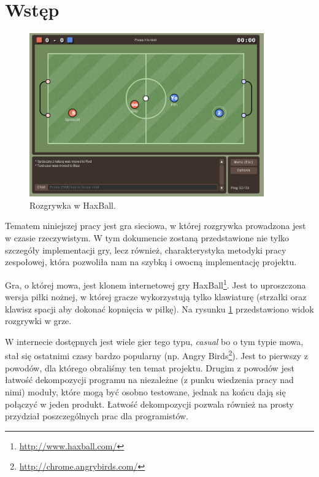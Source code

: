 \section{Wstęp}

\begin{figure}[ht]
    \centering
    \includegraphics[width=0.9\textwidth]{imgs/haxball.png}
    \caption{Rozgrywka w HaxBall.}
    \label{fig:haxball}
\end{figure}

Tematem niniejszej pracy jest gra sieciowa, w której rozgrywka prowadzona jest w czasie rzeczywistym. W tym dokumencie zostaną przedstawione nie tylko szczegóły implementacji gry, lecz również, charakterystyka metodyki pracy zespołowej, która pozwoliła nam na szybką i owocną implementację projektu.

Gra, o której mowa, jest klonem internetowej gry HaxBall\footnote{\url{http://www.haxball.com/}}. Jest to uproszczona wersja piłki nożnej, w której gracze wykorzystują tylko klawiaturę (strzałki oraz klawisz spacji aby dokonać kopnięcia w piłkę). Na rysunku \ref{fig:haxball} przedstawiono widok rozgrywki w grze.

W internecie dostępnych jest wiele gier tego typu, \emph{casual} bo o tym typie mowa, stał się ostatnimi czasy bardzo popularny (np. Angry Birds\footnote{\url{http://chrome.angrybirds.com/}}). Jest to pierwszy z powodów, dla którego obraliśmy ten temat projektu. Drugim z powodów jest łatwość dekompozycji programu na niezależne (z punku wiedzenia pracy nad nimi) moduły, które mogą być osobno testowane, jednak na końcu dają się połączyć w jeden produkt. Łatwość dekompozycji pozwala również na prosty przydział poszczególnych prac dla programistów.




